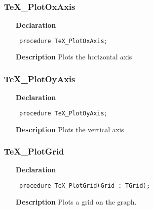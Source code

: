 \documentclass[12pt,a4paper,oneside]{report}
\newcommand{\declarationitem}[1]{\textbf{#1}}
\newcommand{\descriptiontitle}[1]{\textbf{#1}}
\newcommand{\code}[1]{\texttt{#1}}
\begin{document}
\subsubsection{TeX{\_}PlotOxAxis}
\label{utexplot-TeX_PlotOxAxis}
\begin{itemize}\item[\declarationitem{Declaration}\hfill]
	\begin{flushleft}
		\code{
			procedure TeX{\_}PlotOxAxis;}
		
	\end{flushleft}
	
	\par
	\item[\descriptiontitle{Description}]
	Plots the horizontal axis
	
\end{itemize}
\subsubsection{TeX{\_}PlotOyAxis}
\label{utexplot-TeX_PlotOyAxis}
\begin{itemize}\item[\declarationitem{Declaration}\hfill]
	\begin{flushleft}
		\code{
			procedure TeX{\_}PlotOyAxis;}
		
	\end{flushleft}
	
	\par
	\item[\descriptiontitle{Description}]
	Plots the vertical axis
	
\end{itemize}
\subsubsection{TeX{\_}PlotGrid}
\label{utexplot-TeX_PlotGrid}
\begin{itemize}\item[\declarationitem{Declaration}\hfill]
	\begin{flushleft}
		\code{
			procedure TeX{\_}PlotGrid(Grid : TGrid);}
		
	\end{flushleft}
	
	\par
	\item[\descriptiontitle{Description}]
	Plots a grid on the graph.
	
\end{itemize}
\end{document}
